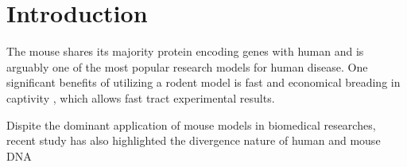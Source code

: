 \section{Introduction}

The mouse shares its majority protein encoding genes with human and is arguably one of the most popular research models for human disease. One significant benefits of utilizing a rodent model is fast and economical breading in captivity \cite{Rosenthal_2007}, which allows fast tract experimental results. \cite{Vandamme_2014} 

Dispite the dominant application of mouse models in biomedical researches, recent study has also highlighted the divergence nature of human and mouse DNA 